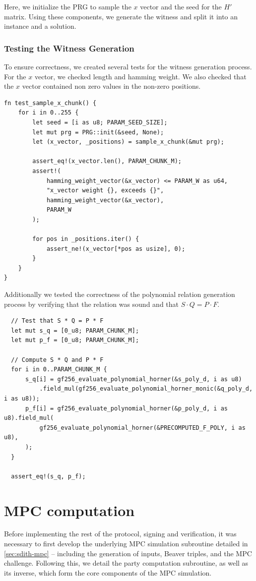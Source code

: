 \documentclass[11pt]{report}
\theoremstyle{definition}
\theoremstyle{plain}
\begin{document}
Here, we initialize the PRG to sample the $x$ vector and the seed for the $H'$ matrix. Using these components, we generate the witness and split it into an instance and a solution.

\subsubsection{Testing the Witness Generation}\label{sub:testing_our_witness_generation}

To ensure correctness, we created several tests for the witness generation process. For the $x$ vector, we checked length and hamming weight. We also checked that the $x$ vector contained non zero values in the non-zero positions.

\begin{verbatim}
fn test_sample_x_chunk() {
    for i in 0..255 {
        let seed = [i as u8; PARAM_SEED_SIZE];
        let mut prg = PRG::init(&seed, None);
        let (x_vector, _positions) = sample_x_chunk(&mut prg);

        assert_eq!(x_vector.len(), PARAM_CHUNK_M);
        assert!(
            hamming_weight_vector(&x_vector) <= PARAM_W as u64,
            "x_vector weight {}, exceeds {}",
            hamming_weight_vector(&x_vector),
            PARAM_W
        );

        for pos in _positions.iter() {
            assert_ne!(x_vector[*pos as usize], 0);
        }
    }
}
\end{verbatim}

Additionally we tested the correctness of the polynomial relation generation process by verifying that the relation was sound and that $S \cdot Q = P \cdot F$.

\begin{verbatim}
  // Test that S * Q = P * F
  let mut s_q = [0_u8; PARAM_CHUNK_M];
  let mut p_f = [0_u8; PARAM_CHUNK_M];

  // Compute S * Q and P * F
  for i in 0..PARAM_CHUNK_M {
      s_q[i] = gf256_evaluate_polynomial_horner(&s_poly_d, i as u8)
          .field_mul(gf256_evaluate_polynomial_horner_monic(&q_poly_d, i as u8));
      p_f[i] = gf256_evaluate_polynomial_horner(&p_poly_d, i as u8).field_mul(
          gf256_evaluate_polynomial_horner(&PRECOMPUTED_F_POLY, i as u8),
      );
  }

  assert_eq!(s_q, p_f);
\end{verbatim}

\section{MPC computation}\label{sub:mpc_algo}
Before implementing the rest of the protocol, signing and verification, it was necessary to first develop the underlying MPC simulation subroutine detailed in \autoref{sec:sdith-mpc} -- including the generation of inputs, Beaver triples, and the MPC challenge. Following this, we detail the party computation subroutine, as well as its inverse, which form the core components of the MPC simulation.
\end{document}

